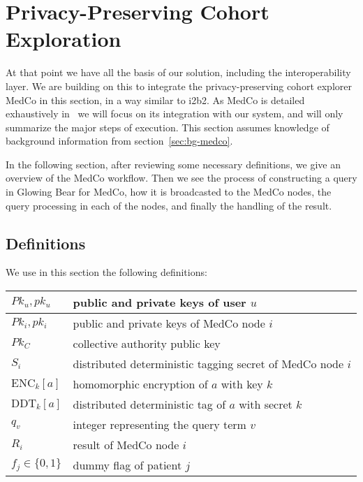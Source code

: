 \chapter{Privacy-Preserving Cohort Exploration}
\label{sec:medco}

At that point we have all the basis of our solution, including the interoperability layer.
We are building on this to integrate the privacy-preserving cohort explorer MedCo in this section, in a way similar to i2b2.
As MedCo is detailed exhaustively in~\cite{medco} we will focus on its integration with our system, and will only summarize the major steps of execution.
This section assumes knowledge of background information from section~\ref{sec:bg-medco}.

In the following section, after reviewing some necessary definitions, we give an overview of the MedCo workflow.
Then we see the process of constructing a query in Glowing Bear for MedCo, how it is broadcasted to the MedCo nodes, the query processing in each of the nodes, and finally the handling of the result.


\section*{Definitions}

We use in this section the following definitions:

\begin{center}
\begin{tabular}{|l|l|}
\hline
$Pk_u, pk_u$ & public and private keys of user $u$ \\\hline
$Pk_i, pk_i$ & public and private keys of MedCo node $i$ \\\hline
$Pk_C$ & collective authority public key \\\hline
$S_i$ & distributed deterministic tagging secret of MedCo node $i$ \\\hline
$\text{ENC}_k[a]$ & homomorphic encryption of $a$ with key $k$ \\\hline
$\text{DDT}_k[a]$ & distributed deterministic tag of $a$ with secret $k$ \\\hline
$q_v$ & integer representing the query term $v$ \\\hline
$R_i$ & result of MedCo node $i$ \\\hline
$f_j \in \{0, 1\}$ & dummy flag of patient $j$ \\\hline
\end{tabular}
\end{center}


